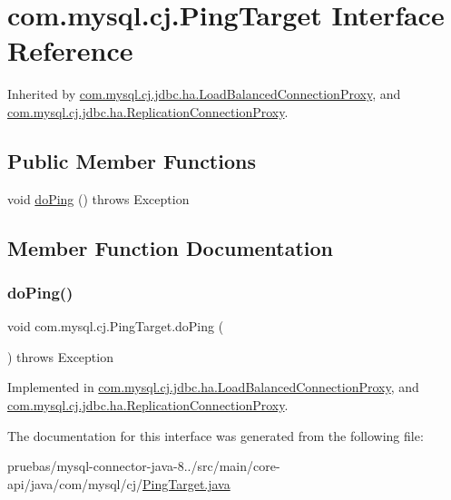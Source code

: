 \hypertarget{interfacecom_1_1mysql_1_1cj_1_1_ping_target}{}\section{com.\+mysql.\+cj.\+Ping\+Target Interface Reference}
\label{interfacecom_1_1mysql_1_1cj_1_1_ping_target}


Inherited by \mbox{\hyperlink{classcom_1_1mysql_1_1cj_1_1jdbc_1_1ha_1_1_load_balanced_connection_proxy}{com.\+mysql.\+cj.\+jdbc.\+ha.\+Load\+Balanced\+Connection\+Proxy}}, and \mbox{\hyperlink{classcom_1_1mysql_1_1cj_1_1jdbc_1_1ha_1_1_replication_connection_proxy}{com.\+mysql.\+cj.\+jdbc.\+ha.\+Replication\+Connection\+Proxy}}.

\subsection*{Public Member Functions}
\begin{DoxyCompactItemize}
\item 
void \mbox{\hyperlink{interfacecom_1_1mysql_1_1cj_1_1_ping_target_a25b7277324c8bd6e4fc6334c042812b6}{do\+Ping}} ()  throws Exception
\end{DoxyCompactItemize}


\subsection{Member Function Documentation}
\mbox{\label{interfacecom_1_1mysql_1_1cj_1_1_ping_target_a25b7277324c8bd6e4fc6334c042812b6}} 
\subsubsection{\texorpdfstring{do\+Ping()}{doPing()}}
{\footnotesize\ttfamily void com.\+mysql.\+cj.\+Ping\+Target.\+do\+Ping (\begin{DoxyParamCaption}{ }\end{DoxyParamCaption}) throws Exception}



Implemented in \mbox{\hyperlink{classcom_1_1mysql_1_1cj_1_1jdbc_1_1ha_1_1_load_balanced_connection_proxy_a735361812f6c57f687ad6512e4bd3809}{com.\+mysql.\+cj.\+jdbc.\+ha.\+Load\+Balanced\+Connection\+Proxy}}, and \mbox{\hyperlink{classcom_1_1mysql_1_1cj_1_1jdbc_1_1ha_1_1_replication_connection_proxy_ae2c2446c646d5bc28578f3f35695ef45}{com.\+mysql.\+cj.\+jdbc.\+ha.\+Replication\+Connection\+Proxy}}.



The documentation for this interface was generated from the following file\+:\begin{DoxyCompactItemize}
\item 
pruebas/mysql-\/connector-\/java-\/8../src/main/core-\/api/java/com/mysql/cj/\mbox{\hyperlink{_ping_target_8java}{Ping\+Target.\+java}}\end{DoxyCompactItemize}
